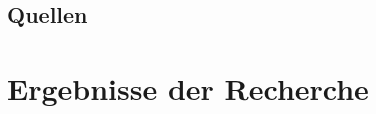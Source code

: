 \subsection{Quellen}
\label{subsec:quellen}

\section{Ergebnisse der Recherche}
\label{sec:ergebnisseDerRecherche}

